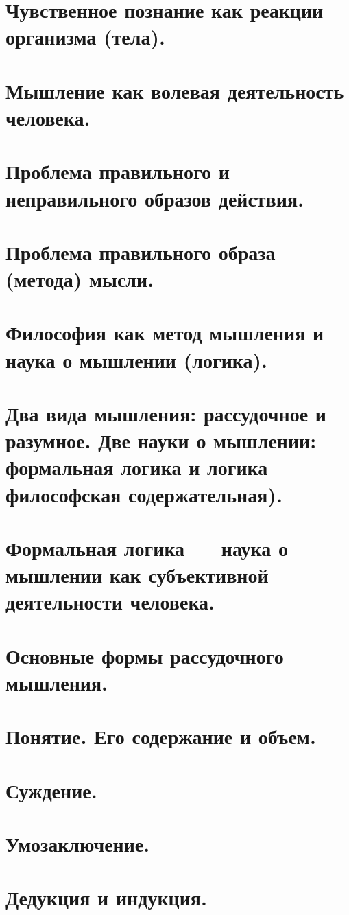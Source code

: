 \section{ Чувственное познание как реакции организма (тела).}
\section{ Мышление как волевая деятельность человека.}
\section{ Проблема правильного и неправильного образов действия.}
\section{ Проблема правильного образа (метода) мысли.}
\section{ Философия как метод мышления и наука о мышлении (логика).}
\section{ Два вида мышления: рассудочное и разумное. Две науки о мышлении: формальная логика и логика философская содержательная).}
\section{ Формальная логика — наука о мышлении как субъективной деятельности человека.}
\section{ Основные формы рассудочного мышления.}
\section{ Понятие. Его содержание и объем.}
\section{ Суждение.}
\section{ Умозаключение.}
\section{ Дедукция и индукция.}
